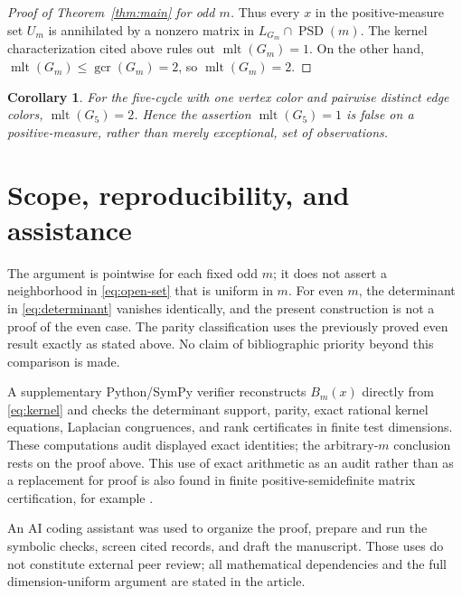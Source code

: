 \documentclass[11pt]{article}
\newtheorem{corollary}[theorem]{Corollary}
\newcommand{\PSD}{\operatorname{PSD}}
\newcommand{\mlt}{\operatorname{mlt}}
\newcommand{\gcr}{\operatorname{gcr}}
\begin{document}
\begin{proof}[Proof of Theorem~\ref{thm:main} for odd $m$]
Thus every $x$ in the positive-measure set $U_m$ is annihilated by a
nonzero matrix in $L_{G_m}\cap\PSD(m)$.  The kernel characterization cited
above rules out $\mlt(G_m)=1$.  On the other hand,
$\mlt(G_m)\leq\gcr(G_m)=2$, so $\mlt(G_m)=2$.
\end{proof}

\begin{corollary}
For the five-cycle with one vertex color and pairwise distinct edge colors,
$\mlt(G_5)=2$.  Hence the assertion $\mlt(G_5)=1$ is false on a
positive-measure, rather than merely exceptional, set of observations.
\end{corollary}

\section{Scope, reproducibility, and assistance}

The argument is pointwise for each fixed odd $m$; it does not assert a
neighborhood in \eqref{eq:open-set} that is uniform in $m$.  For even $m$,
the determinant in \eqref{eq:determinant} vanishes identically, and the
present construction is not a proof of the even case.  The parity
classification uses the previously proved even result exactly as stated
above.  No claim of bibliographic priority beyond this comparison is made.

A supplementary Python/SymPy verifier reconstructs $B_m(x)$ directly from
\eqref{eq:kernel} and checks the determinant support, parity, exact rational
kernel equations, Laplacian congruences, and rank certificates in finite
test dimensions.  These computations audit displayed exact identities; the
arbitrary-$m$ conclusion rests on the proof above.  This use of exact
arithmetic as an audit rather than as a replacement for proof is also found
in finite positive-semidefinite matrix certification, for example
\cite{ZengLiuRatnavelu2026}.

An AI coding assistant was used to organize the proof, prepare and run the
symbolic checks, screen cited records, and draft the manuscript.  Those uses
do not constitute external peer review; all mathematical dependencies and
the full dimension-uniform argument are stated in the article.



\end{document}
